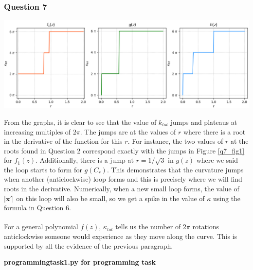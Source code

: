 \documentclass[12pt, a4paper]{article}
\begin{document}
\subsubsection*{Question 7}

\begin{minipage}{\textwidth}
	\includegraphics[width=\linewidth]{q7_fig1}
	\label{q7_fig1}
\end{minipage}\vspace{0.4cm}

From the graphs, it is clear to see that the value of $k_{tot}$ jumps and plateaus at increasing multiples of $2\pi$. The jumps are at the values of $r$ where there is a root in the derivative of the function for this $r$. For instance, the two values of $r$ at the roots found in Question 2 correspond exactly with the jumps in Figure \ref{q7_fig1} for $f_{1}(z)$. Additionally, there is a jump at $r = 1/\sqrt{3}$ in $g(z)$ where we said the loop starts to form for $g(C_{r})$. This demonstrates that the curvature jumps when another (anticlockwise) loop forms and this is precisely where we will find roots in the derivative.   Numerically, when a new small loop forms, the value of $|\bm{x'}|$ on this loop will also be small, so we get a spike in the value of $\kappa$ using the formula in Question 6. %
\\\\
For a general polynomial $f(z)$, $\kappa_{tot}$ tells us the number of $2\pi$ rotations anticlockwise someone would experience as they move along the curve. This is supported by all the evidence of the previous paragraph.


\pagebreak
\textbf{programming\textunderscore task\textunderscore1.py for programming task}\centering\label{programmingtask1}

\vspace{2cm}
\end{document}
